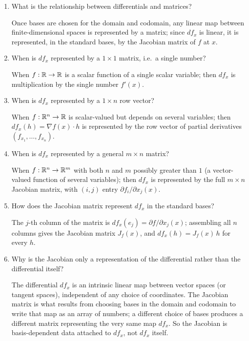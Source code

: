 \documentclass{self-check}
\begin{document}
\begin{enumerate}[resume, leftmargin=*, itemsep=8pt]
\item What is the relationship between differentials and matrices?
\begin{answer}
Once bases are chosen for the domain and codomain, any linear map between finite-dimensional spaces is represented by a matrix; since \(df_x\) is linear, it is represented, in the standard bases, by the Jacobian matrix of \(f\) at \(x\).
\end{answer}

\item When is \(df_x\) represented by a \(1\times1\) matrix, i.e.\ a single number?
\begin{answer}
When \(f:\mathbb{R}\to\mathbb{R}\) is a scalar function of a single scalar variable; then \(df_x\) is multiplication by the single number \(f'(x)\).
\end{answer}

\item When is \(df_x\) represented by a \(1\times n\) row vector?
\begin{answer}
When \(f:\mathbb{R}^n\to\mathbb{R}\) is scalar-valued but depends on several variables; then \(df_x(h)=\nabla f(x)\cdot h\) is represented by the row vector of partial derivatives \((f_{x_1},\dots,f_{x_n})\).
\end{answer}

\item When is \(df_x\) represented by a general \(m\times n\) matrix?
\begin{answer}
When \(f:\mathbb{R}^n\to\mathbb{R}^m\) with both \(n\) and \(m\) possibly greater than \(1\) (a vector-valued function of several variables); then \(df_x\) is represented by the full \(m\times n\) Jacobian matrix, with \((i,j)\) entry \(\partial f_i/\partial x_j(x)\).
\end{answer}

\item How does the Jacobian matrix represent \(df_x\) in the standard bases?
\begin{answer}
The \(j\)-th column of the matrix is \(df_x(e_j)=\partial f/\partial x_j(x)\); assembling all \(n\) columns gives the Jacobian matrix \(J_f(x)\), and \(df_x(h)=J_f(x)\,h\) for every \(h\).
\end{answer}

\item Why is the Jacobian only a representation of the differential rather than the differential itself?
\begin{answer}
The differential \(df_x\) is an intrinsic linear map between vector spaces (or tangent spaces), independent of any choice of coordinates. The Jacobian matrix is what results from choosing bases in the domain and codomain to write that map as an array of numbers; a different choice of bases produces a different matrix representing the very same map \(df_x\). So the Jacobian is basis-dependent data attached to \(df_x\), not \(df_x\) itself.
\end{answer}

\end{enumerate}
\end{document}
